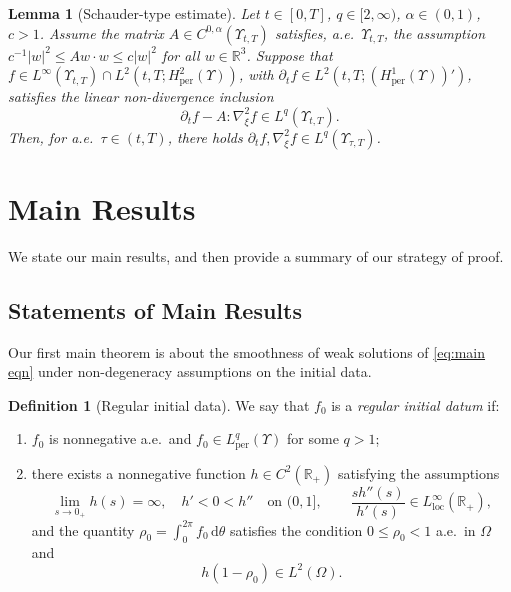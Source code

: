 \documentclass[11pt,a4paper,reqno]{amsart}
\newtheorem{lemma}[prop]{Lemma}
\theoremstyle{remark}
\theoremstyle{definition}
\newtheorem{definition}[prop]{Definition}
\numberwithin{equation}{section}
\newcommand{\per}{\mathrm{per}}
\newcommand{\bxi}{\xi}
\renewcommand{\d}{\, \mathrm{d} }
\newcommand{\loc}{\mathrm{loc}}
\begin{document}
\begin{lemma}[Schauder-type estimate]\label{lem:Lp schauder}
    Let $t \in [0,T]$, $q \in [2,\infty)$, $\alpha \in (0,1)$, $c > 1$. Assume the matrix $A \in C^{0,\alpha}(\Upsilon_{t,T})$ satisfies,  a.e.~$\Upsilon_{t,T}$, the assumption $c^{-1} |w|^2 \leq Aw \cdot w \leq c|w|^2$ for all $w \in \mathbb{R}^3$. Suppose that $f \in L^\infty(\Upsilon_{t,T}) \cap L^2(t,T;H^2_\per(\Upsilon))$, with $\partial_t f \in L^2(t,T;(H^1_\per(\Upsilon))')$, satisfies the linear non-divergence inclusion 
    \begin{equation*}
        \partial_t f - A:\nabla^2_{\bxi} f \in L^q(\Upsilon_{t,T}). 
    \end{equation*}
Then, for a.e.~$\tau \in (t,T)$, there holds $\partial_t f , \nabla^2_{\bxi} f \in L^q(\Upsilon_{\tau,T})$. 
\end{lemma}


    \section{Main Results}\label{sec:main results}

    We state our main results, and then provide a summary of our strategy of proof. 

    \subsection{Statements of Main Results}

    Our first main theorem is about the smoothness of weak solutions of \eqref{eq:main eqn} under non-degeneracy assumptions on the initial data. 
    

    \begin{definition}[Regular initial data]\label{def:reg initial data}
        We say that $f_0$ is a \emph{regular initial datum} if: 
        \begin{enumerate}
            \item[(i)] $f_0$ is nonnegative a.e.~and $f_0 \in L^q_\per(\Upsilon)$ for some $q>1$; 
            \item[(ii)] 
            there exists a nonnegative function $h \in C^2(\mathbb{R}_+)$ satisfying the assumptions
        \begin{equation}\label{eq:conditions on h}
        \lim_{s \to 0_+}h(s) = \infty, \quad   h' < 0 < h''  \quad \text{on } (0,1], \qquad \frac{s h''(s)}{h'(s)} \in L^\infty_{\loc}(\mathbb{R}_+),
        \end{equation}
        and the quantity $\rho_0 = \int_0^{2\pi} f_0 \d \theta$ satisfies the condition $0 \leq \rho_0 < 1$ a.e.~in $\Omega$ and 
        \begin{equation}\label{eq:additional condition for strong parab}
            h(1\!-\!\rho_0) \in L^2(\Omega). 
            \end{equation}
        \end{enumerate}
    \end{definition}
\end{document}

